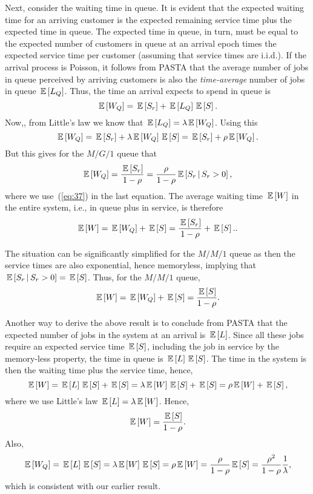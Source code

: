 Next, consider the waiting time in queue.  It is evident that the
expected waiting time for an arriving customer is the expected
remaining service time plus the expected time in queue. The expected
time in queue, in turn, must be equal to the expected number of
customers in queue at an arrival epoch times the expected service time
per customer (assuming that service times are i.i.d.). If the arrival
process is Poisson, it follows from PASTA that the average number of
jobs in queue perceived by arriving customers is also the
\emph{time-average} number of jobs in queue $\,\mathbb{E}\left[L_Q\right]$.  Thus, the time
an arrival expects to spend in queue is 
\begin{equation}\label{eq:24}
  \,\mathbb{E}\left[W_Q\right] = \,\mathbb{E}\left[S_r\right] + \,\mathbb{E}\left[L_Q\right] \,\mathbb{E}\left[S\right].
\end{equation}
Now,, from Little's law we know that $\,\mathbb{E}\left[L_Q\right] = \lambda \,\mathbb{E}\left[W_Q\right]$. Using this
\begin{equation*}
  \,\mathbb{E}\left[W_Q\right] = \,\mathbb{E}\left[S_r\right] + \lambda \,\mathbb{E}\left[W_Q\right] \,\mathbb{E}\left[S\right]  =\,\mathbb{E}\left[S_r\right] + \rho \,\mathbb{E}\left[W_Q\right].
\end{equation*}
But this gives for the $M/G/1$ queue that
\begin{equation}\label{eq:35}
  \,\mathbb{E}\left[W_Q\right] = \frac{\,\mathbb{E}\left[S_r\right]}{1-\rho} = \frac{\rho}{1-\rho} \,\mathbb{E}\left[S_r\,\middle|\, S_r>0\right],
\end{equation}
where we use~(\ref{eq:37}) in the last equation.
The average waiting time $\,\mathbb{E}\left[W\right]$ in the entire system, i.e., in queue
plus in service, is therefore
\begin{equation*}
  \,\mathbb{E}\left[W\right] = \,\mathbb{E}\left[W_Q\right]+ \,\mathbb{E}\left[S\right] = \frac{\,\mathbb{E}\left[S_r\right]}{1-\rho} + \,\mathbb{E}\left[S\right]..
\end{equation*}

The situation can be significantly simplified for the $M/M/1$ queue as
then the service times are also exponential, hence memoryless,
implying that $\,\mathbb{E}\left[S_r\,\middle|\, S_r>0\right] = \,\mathbb{E}\left[S\right]$. Thus, for the $M/M/1$ queue,
\begin{equation*}
  \,\mathbb{E}\left[W\right] = \,\mathbb{E}\left[W_Q\right]+ \,\mathbb{E}\left[S\right] = \frac{\,\mathbb{E}\left[S\right]}{1-\rho}.
\end{equation*}


Another way to derive the above result is to conclude from PASTA that
the expected number of jobs in the system at an arrival is $\,\mathbb{E}\left[L\right]$.
Since all these jobs require an expected service time $\,\mathbb{E}\left[S\right]$,
including the job in service by the memory-less property, the time in
queue is $\,\mathbb{E}\left[L\right] \,\mathbb{E}\left[S\right]$. The time in the system is then the waiting time
plus the service time, hence,
\begin{equation}\label{eq:61}
  \,\mathbb{E}\left[W\right] = \,\mathbb{E}\left[L\right]  \,\mathbb{E}\left[S\right] + \,\mathbb{E}\left[S\right] = \lambda \,\mathbb{E}\left[W\right] \,\mathbb{E}\left[S\right] + \,\mathbb{E}\left[S\right] = \rho \,\mathbb{E}\left[W\right]  + \,\mathbb{E}\left[S\right],
\end{equation}
where we use Little's law $\,\mathbb{E}\left[L\right] = \lambda \,\mathbb{E}\left[W\right]$.  Hence,
\begin{equation*}
\,\mathbb{E}\left[W\right] = \frac{\,\mathbb{E}\left[S\right]}{1-\rho}.
\end{equation*}
Also,
\begin{equation*}
  \,\mathbb{E}\left[W_Q\right] = \,\mathbb{E}\left[L\right] \,\mathbb{E}\left[S\right] = \lambda \,\mathbb{E}\left[W\right] \,\mathbb{E}\left[S\right]= \rho \,\mathbb{E}\left[W\right] = \frac{\rho}{1-\rho} \,\mathbb{E}\left[S\right] = \frac{\rho^2}{1-\rho} \frac 1 \lambda,
\end{equation*}
which is consistent with our earlier result.  

